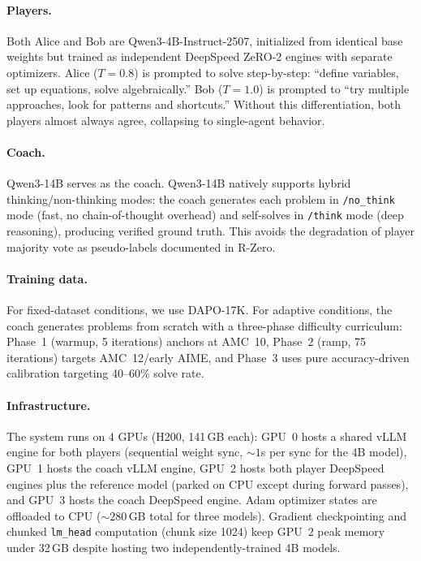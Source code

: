 \documentclass{article}
\begin{document}
\paragraph{Players.} Both Alice and Bob are Qwen3-4B-Instruct-2507, initialized from identical base weights but trained as independent DeepSpeed ZeRO-2 engines with separate optimizers. Alice ($T\!=\!0.8$) is prompted to solve step-by-step: ``define variables, set up equations, solve algebraically.'' Bob ($T\!=\!1.0$) is prompted to ``try multiple approaches, look for patterns and shortcuts.'' Without this differentiation, both players almost always agree, collapsing to single-agent behavior.

\paragraph{Coach.} Qwen3-14B serves as the coach. Qwen3-14B natively supports hybrid thinking/non-thinking modes: the coach generates each problem in \texttt{/no\_think} mode (fast, no chain-of-thought overhead) and self-solves in \texttt{/think} mode (deep reasoning), producing verified ground truth. This avoids the degradation of player majority vote as pseudo-labels documented in R-Zero.

\paragraph{Training data.} For fixed-dataset conditions, we use DAPO-17K. For adaptive conditions, the coach generates problems from scratch with a three-phase difficulty curriculum: Phase~1 (warmup, 5 iterations) anchors at AMC~10, Phase~2 (ramp, 75 iterations) targets AMC~12/early AIME, and Phase~3 uses pure accuracy-driven calibration targeting 40--60\% solve rate.

\paragraph{Infrastructure.} The system runs on 4 GPUs (H200, 141\,GB each): GPU~0 hosts a shared vLLM engine for both players (sequential weight sync, ${\sim}1$s per sync for the 4B model), GPU~1 hosts the coach vLLM engine, GPU~2 hosts both player DeepSpeed engines plus the reference model (parked on CPU except during forward passes), and GPU~3 hosts the coach DeepSpeed engine. Adam optimizer states are offloaded to CPU (${\sim}280$\,GB total for three models). Gradient checkpointing and chunked \texttt{lm\_head} computation (chunk size 1024) keep GPU~2 peak memory under 32\,GB despite hosting two independently-trained 4B models.
\end{document}
